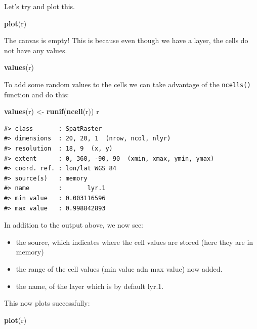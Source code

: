 \documentclass[
]{book}
\newenvironment{Shaded}{\begin{snugshade}}{\end{snugshade}}
\newcommand{\FunctionTok}[1]{\textcolor[rgb]{0.13,0.29,0.53}{\textbf{#1}}}
\newcommand{\NormalTok}[1]{#1}
\newcommand{\OtherTok}[1]{\textcolor[rgb]{0.56,0.35,0.01}{#1}}
\providecommand{\tightlist}{%
  \setlength{\itemsep}{0pt}\setlength{\parskip}{0pt}}
\begin{document}
Let's try and plot this.

\begin{Shaded}
\begin{Highlighting}[]
\FunctionTok{plot}\NormalTok{(r)}
\end{Highlighting}
\end{Shaded}

The canvas is empty! This is because even though we have a layer, the cells do not have any values.

\begin{Shaded}
\begin{Highlighting}[]
\FunctionTok{values}\NormalTok{(r)}
\end{Highlighting}
\end{Shaded}

To add some random values to the cells we can take advantage of the \texttt{ncells()} function and do this:

\begin{Shaded}
\begin{Highlighting}[]
\FunctionTok{values}\NormalTok{(r) }\OtherTok{\textless{}{-}} \FunctionTok{runif}\NormalTok{(}\FunctionTok{ncell}\NormalTok{(r))}
\NormalTok{r }
\end{Highlighting}
\end{Shaded}

\begin{verbatim}
#> class       : SpatRaster 
#> dimensions  : 20, 20, 1  (nrow, ncol, nlyr)
#> resolution  : 18, 9  (x, y)
#> extent      : 0, 360, -90, 90  (xmin, xmax, ymin, ymax)
#> coord. ref. : lon/lat WGS 84 
#> source(s)   : memory
#> name        :       lyr.1 
#> min value   : 0.003116596 
#> max value   : 0.998842893
\end{verbatim}

In addition to the output above, we now see:

\begin{itemize}
\tightlist
\item
  the source, which indicates where the cell values are stored (here they are in memory)
\item
  the range of the cell values (min value adn max value) now added.
\item
  the name, of the layer which is by default lyr.1.
\end{itemize}

This now plots successfully:

\begin{Shaded}
\begin{Highlighting}[]
\FunctionTok{plot}\NormalTok{(r)}
\end{Highlighting}
\end{Shaded}
\end{document}
